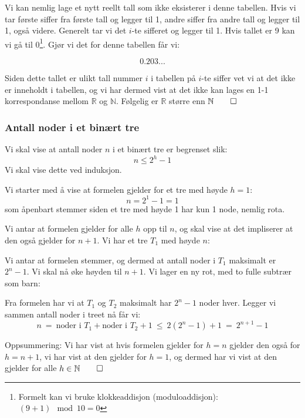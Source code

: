 Vi kan nemlig lage et nytt reellt tall som ikke eksisterer i denne tabellen. Hvis vi tar første siffer fra første tall og legger til 1, andre siffer fra andre tall og legger til 1, også videre. Generelt tar vi det $ i $-te sifferet og legger til 1. Hvis tallet er 9 kan vi gå til 0\footnote{Formelt kan vi bruke klokkeaddisjon (moduloaddisjon): $ (9 + 1) \mod{10}  = 0 $}. Gjør vi det for denne tabellen får vi:

\[ 0.203...  \]

Siden dette tallet er ulikt tall nummer $ i $ i tabellen på $ i $-te siffer vet vi at det ikke er inneholdt i tabellen, og vi har dermed vist at det ikke kan lages en 1-1 korrespondanse mellom $ \mathbb{R} $ og $ \mathbb{N} $. Følgelig er $ \mathbb{R} $ større enn $ \mathbb{N} \hfill\qed$ 


\newpage
\subsubsection{Antall noder i et binært tre}
Vi skal vise at antall noder $ n $ i et binært tre er begrenset slik:
\begin{equation*}
n \leq 2^{h} - 1
\end{equation*}
Vi skal vise dette ved induksjon.

Vi starter med å vise at formelen gjelder for et tre med høyde $ h=1 $:
\[ n = 2^1 - 1 = 1 \]
som åpenbart stemmer siden et tre med høyde 1 har kun 1 node, nemlig rota.

Vi antar at formelen gjelder for alle $ h $ opp til $ n $, og skal vise at det impliserer at den også gjelder for $ n+1 $. Vi har et tre $ T_1 $ med høyde $ n $:
\begin{center}
\end{center}
Vi antar at formelen stemmer, og dermed at antall noder i $ T_1 $ maksimalt er $ 2^n - 1 $. Vi skal nå øke høyden til $ n+1 $. Vi lager en ny rot, med to fulle subtrær som barn:
\begin{center}
\end{center}
Fra formelen har vi at $ T_1 $ og $ T_2 $ maksimalt har $ 2^n-1 $ noder hver. Legger vi sammen antall noder i treet nå får vi:
\[ n ~=~ \text{noder i } T_1 + \text{noder i } T_2 + 1 ~\leq~ 2(2^n -1) + 1 ~=~ 2^{n+1} - 1 \]

Oppsummering: Vi har vist at hvis formelen gjelder for $ h=n $ gjelder den også for $ h=n+1 $, vi har vist at den gjelder for $ h=1 $, og dermed har vi vist at den gjelder for alle $ h \in \mathbb{N} \hfill\qed$